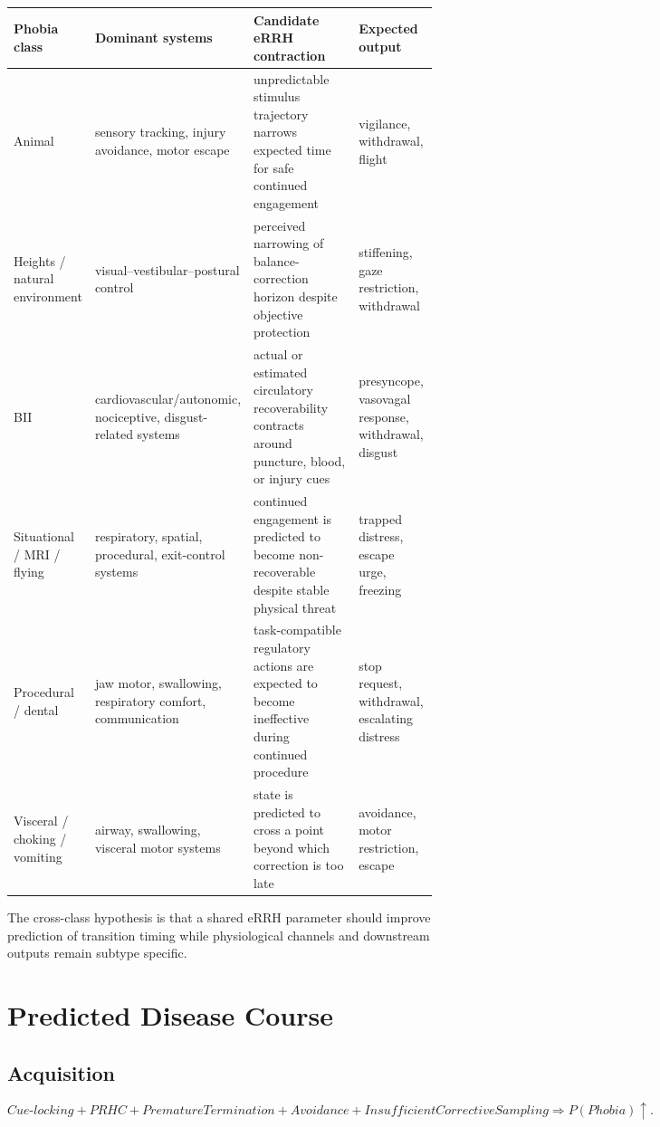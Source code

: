 \documentclass[11pt]{article}
\begin{document}
\begin{longtable}{p{0.18\linewidth}p{0.27\linewidth}p{0.29\linewidth}p{0.19\linewidth}}
\toprule
Phobia class & Dominant systems & Candidate eRRH contraction & Expected output \\
\midrule
Animal & sensory tracking, injury avoidance, motor escape & unpredictable stimulus trajectory narrows expected time for safe continued engagement & vigilance, withdrawal, flight \\
Heights / natural environment & visual--vestibular--postural control & perceived narrowing of balance-correction horizon despite objective protection & stiffening, gaze restriction, withdrawal \\
BII & cardiovascular/autonomic, nociceptive, disgust-related systems & actual or estimated circulatory recoverability contracts around puncture, blood, or injury cues & presyncope, vasovagal response, withdrawal, disgust \\
Situational / MRI / flying & respiratory, spatial, procedural, exit-control systems & continued engagement is predicted to become non-recoverable despite stable physical threat & trapped distress, escape urge, freezing \\
Procedural / dental & jaw motor, swallowing, respiratory comfort, communication & task-compatible regulatory actions are expected to become ineffective during continued procedure & stop request, withdrawal, escalating distress \\
Visceral / choking / vomiting & airway, swallowing, visceral motor systems & state is predicted to cross a point beyond which correction is too late & avoidance, motor restriction, escape \\
\bottomrule
\end{longtable}

The cross-class hypothesis is that a shared eRRH parameter should improve prediction of transition timing while physiological channels and downstream outputs remain subtype specific.

\section{Predicted Disease Course}
\subsection{Acquisition}
\[
Cue\text{-}locking+PRHC+PrematureTermination+Avoidance+InsufficientCorrectiveSampling
\Rightarrow P(Phobia)\uparrow.
\]
\end{document}

